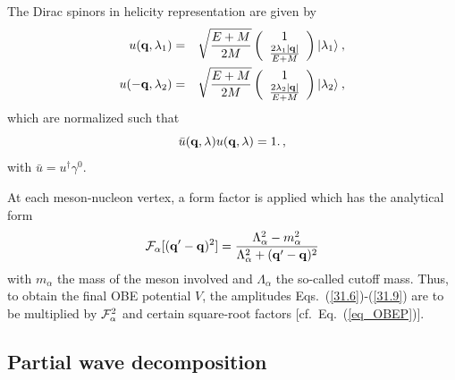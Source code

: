 The Dirac spinors in helicity representation are given by
\begin{eqnarray}
u({\bf  q},\lambda_1)&=&\sqrt{\frac{E+M}{2M}}
\left( \begin{array}{c}
       1\\
       \frac{2\lambda_1 |{\bf q}|}{E+M}
       \end{array} \right)
|\lambda_1\rangle
\: ,
\label{31.11} \\
u(-{\bf  q},\lambda_2)&=&\sqrt{\frac{E+M}{2M}}
\left( \begin{array}{c}
       1\\
       \frac{2\lambda_2 |{\bf q}|}{E+M}
       \end{array} \right)
|\lambda_2\rangle
\: ,
\end{eqnarray}
which are normalized such that
\begin{equation}
\bar{u}({\bf  q},\lambda) u({\bf  q},\lambda)=1.
\, ,
\label{31.12}
\end{equation}
with $\bar{u}=u^{\dagger}\gamma^{0}$.

At each meson-nucleon vertex, a form factor is applied which has the 
analytical form
\begin{equation}
{\cal F}_\alpha[({\bf  q}'-{\bf  q})^2]=
\frac{\Lambda^2_\alpha-m^2_\alpha}
{\Lambda^2_\alpha+({\bf  q}'-{\bf  q})^2} 
\label{31.13}
\end{equation}
with $m_\alpha$ the mass of the meson involved and  
$\Lambda_\alpha$ the so-called cutoff mass.
Thus, to obtain the final OBE potential $V$, 
the amplitudes Eqs.~(\ref{31.6})-(\ref{31.9}) are to be multiplied
by ${\cal F}_\alpha^2$ and certain square-root factors 
[cf.\ Eq.~(\ref{eq_OBEP})].


\subsection{Partial wave decomposition}

